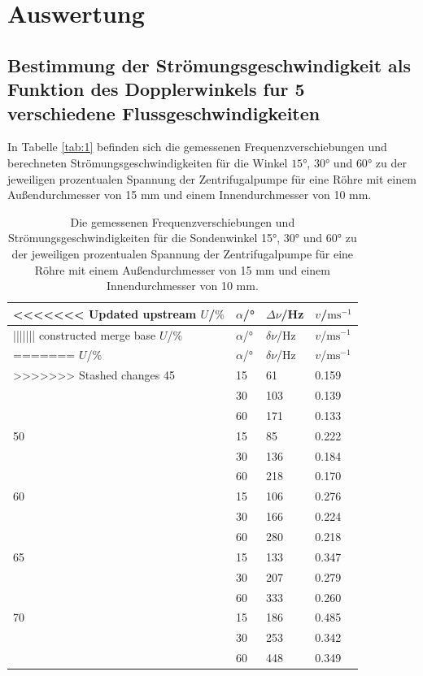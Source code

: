 \section{Auswertung}
\label{sec:Auswertung}

\subsection{Bestimmung der Strömungsgeschwindigkeit als Funktion des Dopplerwinkels fur 5 verschiedene Flussgeschwindigkeiten}
In Tabelle \autoref{tab:1} befinden sich die gemessenen Frequenzverschiebungen und berechneten Strömungsgeschwindigkeiten für die Winkel $15$°, $30$° und $60$° zu der jeweiligen prozentualen Spannung der Zentrifugalpumpe für eine Röhre mit einem Außendurchmesser von 15 mm und einem Innendurchmesser von 10 mm.
\begin{table}[H]
  \centering
  \caption{Die gemessenen Frequenzverschiebungen und Strömungsgeschwindigkeiten für die Sondenwinkel 15°, 30° und 60° zu der jeweiligen prozentualen Spannung der Zentrifugalpumpe für eine Röhre mit einem Außendurchmesser von 15 mm und einem Innendurchmesser von 10 mm.}
  \begin{tabular}{l|l|l|l}
<<<<<<< Updated upstream
  $U$/$\%$ & $\alpha$/° & $\Delta\nu$/Hz & $v$/$\textrm{ms}^{-1}$\\\hline
||||||| constructed merge base
  $U$/$\%$ & $\alpha$/° & $\delta\nu$/Hz & $v$/$\textrm{ms}^{-1}$\\\hline
=======
  $U$/$\%$ & $\alpha$/° & $\delta\nu$/Hz & $v$/$\textrm{ms}^{-1}$\\ \hline
>>>>>>> Stashed changes
  45 & 15 & 61 & 0.159\\
     & 30 & 103 & 0.139\\
     & 60 & 171 & 0.133\\ \hline
  50 & 15 & 85 & 0.222\\
     & 30 & 136 & 0.184\\
     & 60 & 218 & 0.170\\ \hline
  60 & 15 & 106 & 0.276\\
     & 30 & 166 & 0.224\\
     & 60 & 280 & 0.218\\ \hline
  65 & 15 & 133 & 0.347\\
     & 30 & 207 & 0.279\\
     & 60 & 333 & 0.260\\ \hline
  70 & 15 & 186 & 0.485\\
     & 30 & 253 & 0.342\\
     & 60 & 448 & 0.349\\ \hline
  \end{tabular}
  \label{tab:1}
\end{table}
